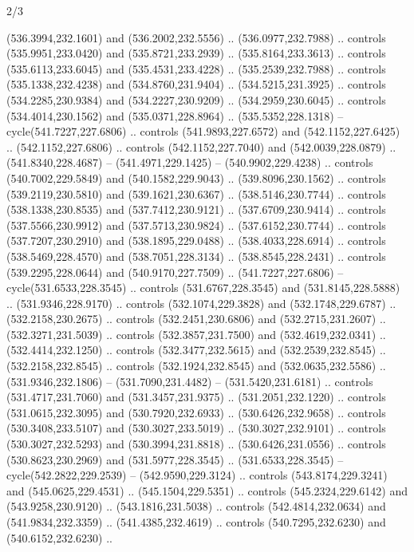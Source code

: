 \begin{flagdescription}{2/3}
\begin{scope}[xshift=0.5\flaglength,yshift=0.5\flagwidth,scale=\flagwidth/495.65]
\begin{scope}[y=0.8pt, x=0.8pt, yscale=-1,shift={(-463.76,-309.78)}]
  (536.3994,232.1601) and (536.2002,232.5556) .. (536.0977,232.7988) .. controls
  (535.9951,233.0420) and (535.8721,233.2939) .. (535.8164,233.3613) .. controls
  (535.6113,233.6045) and (535.4531,233.4228) .. (535.2539,232.7988) .. controls
  (535.1338,232.4238) and (534.8760,231.9404) .. (534.5215,231.3925) .. controls
  (534.2285,230.9384) and (534.2227,230.9209) .. (534.2959,230.6045) .. controls
  (534.4014,230.1562) and (535.0371,228.8964) .. (535.5352,228.1318) --
  cycle(541.7227,227.6806) .. controls (541.9893,227.6572) and
  (542.1152,227.6425) .. (542.1152,227.6806) .. controls (542.1152,227.7040) and
  (542.0039,228.0879) .. (541.8340,228.4687) -- (541.4971,229.1425) --
  (540.9902,229.4238) .. controls (540.7002,229.5849) and (540.1582,229.9043) ..
  (539.8096,230.1562) .. controls (539.2119,230.5810) and (539.1621,230.6367) ..
  (538.5146,230.7744) .. controls (538.1338,230.8535) and (537.7412,230.9121) ..
  (537.6709,230.9414) .. controls (537.5566,230.9912) and (537.5713,230.9824) ..
  (537.6152,230.7744) .. controls (537.7207,230.2910) and (538.1895,229.0488) ..
  (538.4033,228.6914) .. controls (538.5469,228.4570) and (538.7051,228.3134) ..
  (538.8545,228.2431) .. controls (539.2295,228.0644) and (540.9170,227.7509) ..
  (541.7227,227.6806) -- cycle(531.6533,228.3545) .. controls
  (531.6767,228.3545) and (531.8145,228.5888) .. (531.9346,228.9170) .. controls
  (532.1074,229.3828) and (532.1748,229.6787) .. (532.2158,230.2675) .. controls
  (532.2451,230.6806) and (532.2715,231.2607) .. (532.3271,231.5039) .. controls
  (532.3857,231.7500) and (532.4619,232.0341) .. (532.4414,232.1250) .. controls
  (532.3477,232.5615) and (532.2539,232.8545) .. (532.2158,232.8545) .. controls
  (532.1924,232.8545) and (532.0635,232.5586) .. (531.9346,232.1806) --
  (531.7090,231.4482) -- (531.5420,231.6181) .. controls (531.4717,231.7060) and
  (531.3457,231.9375) .. (531.2051,232.1220) .. controls (531.0615,232.3095) and
  (530.7920,232.6933) .. (530.6426,232.9658) .. controls (530.3408,233.5107) and
  (530.3027,233.5019) .. (530.3027,232.9101) .. controls (530.3027,232.5293) and
  (530.3994,231.8818) .. (530.6426,231.0556) .. controls (530.8623,230.2969) and
  (531.5977,228.3545) .. (531.6533,228.3545) -- cycle(542.2822,229.2539) --
  (542.9590,229.3124) .. controls (543.8174,229.3241) and (545.0625,229.4531) ..
  (545.1504,229.5351) .. controls (545.2324,229.6142) and (543.9258,230.9120) ..
  (543.1816,231.5038) .. controls (542.4814,232.0634) and (541.9834,232.3359) ..
  (541.4385,232.4619) .. controls (540.7295,232.6230) and (540.6152,232.6230) ..

\end{scope}
\end{scope}
\end{flagdescription}
